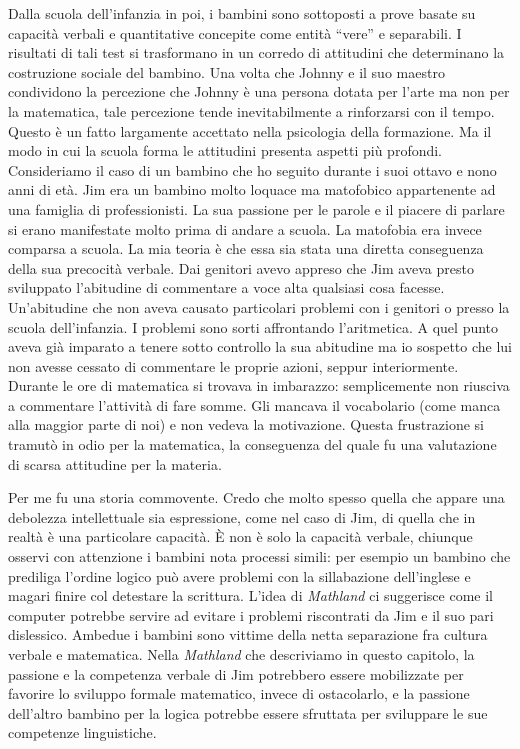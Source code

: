 Dalla scuola dell'infanzia in poi, i bambini sono sottoposti a prove basate su capacità verbali e quantitative concepite come entità “vere” e separabili. I risultati di tali test si trasformano in un corredo di attitudini che determinano la costruzione sociale del bambino. Una volta che Johnny e il suo maestro condividono la percezione che Johnny è una persona dotata per l'arte ma non per la matematica, tale percezione tende inevitabilmente a rinforzarsi con il tempo. Questo è un fatto largamente accettato nella psicologia della formazione. Ma il modo in cui la scuola forma le attitudini presenta aspetti più profondi. Consideriamo il caso di un bambino  che ho seguito durante i suoi ottavo e nono anni di età. Jim era un bambino molto loquace ma matofobico appartenente ad una famiglia di professionisti. La sua passione per le parole e il piacere di parlare si erano manifestate molto prima di andare a scuola. La matofobia era invece comparsa a scuola. La mia teoria è che essa sia stata una diretta conseguenza della sua precocità verbale. Dai genitori avevo appreso che Jim aveva presto sviluppato l'abitudine di commentare a voce alta qualsiasi cosa facesse. Un'abitudine che non aveva causato particolari problemi con i genitori o presso la scuola dell'infanzia. I problemi sono sorti affrontando l'aritmetica. A quel punto aveva già imparato a tenere sotto controllo la sua abitudine ma io sospetto che lui non avesse cessato di commentare le proprie azioni, seppur interiormente. Durante le ore di matematica si trovava in imbarazzo: semplicemente non riusciva a commentare l'attività di fare somme. Gli mancava il vocabolario (come manca alla maggior parte di noi) e non vedeva la motivazione. Questa frustrazione si tramutò in odio per la matematica, la conseguenza del quale fu una valutazione di scarsa attitudine per la materia. 

Per me fu una storia commovente. Credo che molto spesso quella che appare una debolezza intellettuale sia espressione, come nel caso di Jim, di quella che in realtà è una particolare capacità. È non è solo la capacità verbale, chiunque osservi con attenzione i bambini nota processi simili: per esempio un bambino che prediliga l'ordine logico può avere problemi con la sillabazione dell'inglese e magari finire col detestare la scrittura. L'idea di \textit{Mathland} ci suggerisce come il computer potrebbe servire ad evitare i problemi riscontrati da Jim e il suo pari dislessico. Ambedue i bambini sono vittime della netta separazione fra cultura verbale e matematica. Nella \textit{Mathland} che descriviamo in questo capitolo, la passione e la competenza verbale di Jim potrebbero essere mobilizzate per favorire lo sviluppo formale matematico, invece di ostacolarlo, e la passione dell'altro bambino per la logica potrebbe essere sfruttata per sviluppare le sue competenze linguistiche. 

